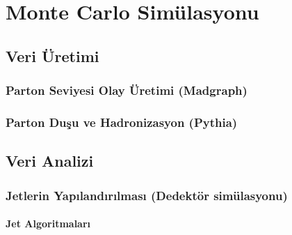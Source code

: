 \chapter{Monte Carlo Simülasyonu}
\section{Veri Üretimi}
\lipsum[2-3]
\subsection{Parton Seviyesi Olay Üretimi (Madgraph)}
\lipsum[2-3]
\subsection{Parton Duşu ve Hadronizasyon (Pythia)}
\lipsum[2-3]
\section{Veri Analizi}
\lipsum[2-3]
\subsection{Jetlerin Yapılandırılması (Dedektör simülasyonu)}
\lipsum[2-3]
\subsubsection{Jet Algoritmaları}
\lipsum[2-3]
